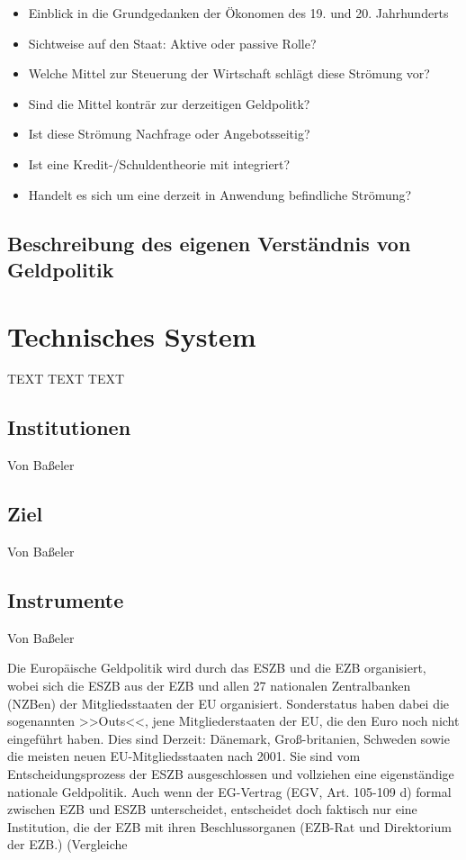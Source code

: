 \documentclass[
onecolumn,
a4paper,
abstracton,
parskip=half
,final
]{scrartcl}
\begin{document}
\begin{itemize}
\item Einblick in die Grundgedanken der {\"O}konomen des 19. und 20. Jahrhunderts
\item Sichtweise auf den Staat: Aktive oder passive Rolle?
\item Welche Mittel zur Steuerung der Wirtschaft schl{\"a}gt diese Str{\"o}mung vor?
\item Sind die Mittel kontr{\"a}r zur derzeitigen Geldpolitk?
\item Ist diese Str{\"o}mung Nachfrage oder Angebotsseitig?
\item Ist eine Kredit-/Schuldentheorie mit integriert?
\item Handelt es sich um eine derzeit in Anwendung befindliche Str{\"o}mung?
\end{itemize}



\subsection{Beschreibung des eigenen Verst{\"a}ndnis von Geldpolitik}

\clearpage

\section{Technisches System}
\label{sec1:technischesSystem}
TEXT TEXT TEXT
\subsection{Institutionen} Von Ba{\ss}eler
\subsection{Ziel}  Von Ba{\ss}eler
\subsection{Instrumente}  Von Ba{\ss}eler

Die Europ{\"a}ische Geldpolitik wird durch das \ac{ESZB} und die \ac{EZB} organisiert, wobei sich die \ac{ESZB} aus der \acf{EZB} und allen 27 nationalen Zentralbanken (NZBen) der Mitgliedsstaaten der \ac{EU} organisiert. Sonderstatus haben dabei die sogenannten >>Outs<<, jene Mitgliederstaaten der \ac{EU}, die den Euro noch nicht eingef{\"u}hrt haben. Dies sind Derzeit: D{\"a}nemark, Gro{\ss}-britanien, Schweden sowie die meisten neuen \acs{EU}-Mitgliedsstaaten nach 2001. Sie sind vom Entscheidungsprozess der \acs{ESZB} ausgeschlossen und vollziehen eine eigenst{\"a}ndige nationale Geldpolitik. Auch wenn der \acs{EG}-Vertrag (EGV, Art. 105-109 d) formal zwischen \ac{EZB} und \ac{ESZB} unterscheidet, entscheidet doch faktisch nur eine Institution, die der \ac{EZB} mit ihren Beschlussorganen (EZB-Rat und Direktorium der \ac{EZB}.) (Vergleiche
\end{document}
